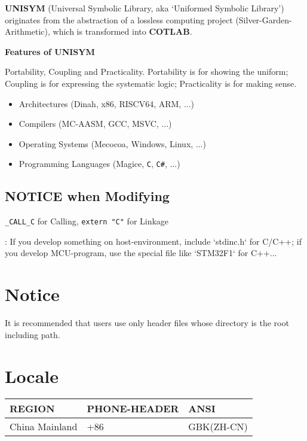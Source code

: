 

\textbf{UNISYM} (Universal Symbolic Library, aka `Uniformed Symbolic Library') originates from the abstraction of a lossless computing project (Silver-Garden-Arithmetic), which is transformed into \textbf{COTLAB}.

\textbf{Features of UNISYM}

Portability, Coupling and Practicality. Portability is for showing the uniform; Coupling is for expressing the systematic logic; Practicality is for making sense.

\begin{itemize}
	\item Architectures (Dinah, x86, RISCV64, ARM, ...)
	\item Compilers (MC-AASM, GCC, MSVC, ...)
	\item Operating Systems (Mecocoa, Windows, Linux, ...)
	\item Programming Languages (Magice, \verb|C|, \verb|C#|, ...)
\end{itemize}

\subsection{NOTICE when Modifying}

\verb`_CALL_C` for Calling, \verb`extern "C"` for Linkage


:
If you develop something on host-environment, include `stdinc.h` for C/C++;
if you develop MCU-program, use the special file like `STM32F1` for C++...

\section{Notice}

It is recommended that users use only header files whose directory is the root including path.


\section{Locale}

\begin{center}\begin{table}[h!]
	\begin{tabular}{|l|l|l|}
	\hline
	\rowcolor[rgb]{0.95, 0.975, 1}\textbf{REGION} & \textbf{PHONE-HEADER} & \textbf{ANSI} \\ \hline
	China Mainland & +86 & GBK(ZH-CN) \\ \hline
	\end{tabular}
\end{table}\end{center}


